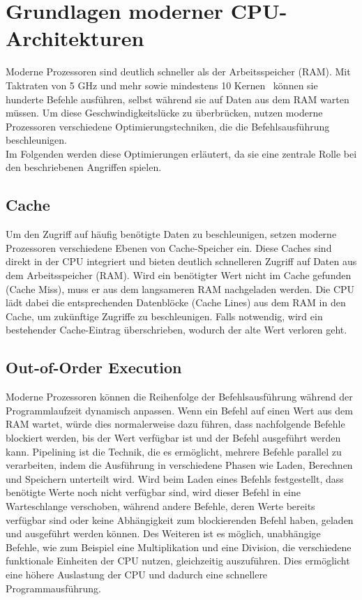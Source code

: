 \section{Grundlagen moderner CPU-Architekturen}
\label{sec:grundlagen-moderner-cpu-architekturen}
Moderne Prozessoren sind deutlich schneller als der Arbeitsspeicher (RAM).
Mit Taktraten von 5 GHz und mehr sowie mindestens 10 Kernen~\cite{ryzen_9} können sie hunderte Befehle ausführen, selbst während sie auf Daten aus dem RAM warten müssen.
Um diese Geschwindigkeitslücke zu überbrücken, nutzen moderne Prozessoren verschiedene Optimierungstechniken, die die Befehlsausführung beschleunigen. \\
Im Folgenden werden diese Optimierungen erläutert, da sie eine zentrale Rolle bei den beschriebenen Angriffen spielen.

\subsection{Cache}
\label{subsec:cache}
Um den Zugriff auf häufig benötigte Daten zu beschleunigen, setzen moderne Prozessoren verschiedene Ebenen von Cache-Speicher ein.
Diese Caches sind direkt in der CPU integriert und bieten deutlich schnelleren Zugriff auf Daten aus dem Arbeitsspeicher (RAM).
Wird ein benötigter Wert nicht im Cache gefunden (Cache Miss), muss er aus dem langsameren RAM nachgeladen werden.
Die CPU lädt dabei die entsprechenden Datenblöcke (Cache Lines) aus dem RAM in den Cache, um zukünftige Zugriffe zu beschleunigen.
Falls notwendig, wird ein bestehender Cache-Eintrag überschrieben, wodurch der alte Wert verloren geht.

\subsection{Out-of-Order Execution}
\label{subsec:out-of-order-execution}
Moderne Prozessoren können die Reihenfolge der Befehlsausführung während der Programmlaufzeit dynamisch anpassen.
Wenn ein Befehl auf einen Wert aus dem RAM wartet, würde dies normalerweise dazu führen, dass nachfolgende Befehle blockiert werden, bis der Wert verfügbar ist und der Befehl ausgeführt werden kann.
Pipelining ist die Technik, die es ermöglicht, mehrere Befehle parallel zu verarbeiten, indem die Ausführung in verschiedene Phasen wie Laden, Berechnen und Speichern unterteilt wird.
Wird beim Laden eines Befehls festgestellt, dass benötigte Werte noch nicht verfügbar sind, wird dieser Befehl in eine Warteschlange verschoben, während andere Befehle, deren Werte bereits verfügbar sind oder keine Abhängigkeit zum blockierenden Befehl haben, geladen und ausgeführt werden können.
Des Weiteren ist es möglich, unabhängige Befehle, wie zum Beispiel eine Multiplikation und eine Division, die verschiedene funktionale Einheiten der CPU nutzen, gleichzeitig auszuführen.
Dies ermöglicht eine höhere Auslastung der CPU und dadurch eine schnellere Programmausführung.


